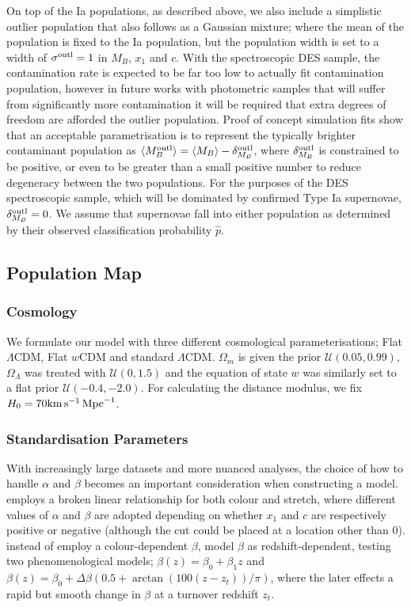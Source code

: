 \documentclass[a4paper,fleqn,usenatbib]{mnras}
\newcommand{\kmsmpc}{{\rm km}\,{\rm s}^{-1}\,{\rm Mpc}^{-1}}
\newcommand{\rubin}{\citetalias{Rubin2015}}
\begin{document}
On top of the Ia populations, as described above, we also include a simplistic outlier population that also follows {\rubin} \citep[and therefore ][]{Kunz2007} as a Gaussian mixture; where the mean of the population is fixed to the Ia population, but the population width is set to a width of $\sigma^{\rm outl} = 1$ in $M_B$, $x_1$ and $c$. With the spectroscopic DES sample, the contamination rate is expected to be far too low to actually fit contamination population, however in future works with photometric samples that will suffer from significantly more contamination it will be required that extra degrees of freedom are afforded the outlier population. Proof of concept simulation fits show that an acceptable parametrisation is to represent the typically brighter contaminant population as $\langle M_B^{\rm outl} \rangle = \langle M_B \rangle - \delta_{M_B}^{\rm outl}$, where $\delta_{M_B}^{\rm outl}$ is constrained to be positive, or even to be greater than a small positive number to reduce degeneracy between the two populations. For the purposes of the DES spectroscopic sample, which will be dominated by confirmed Type Ia supernovae, $\delta_{M_B}^{\rm outl} =0$. We assume that supernovae fall into either population as determined by their observed classification probability $\hat{p}$.


\subsection{Population Map}

\subsubsection{Cosmology}

We formulate our model with three different cosmological parameterisations; Flat $\Lambda$CDM, Flat $w$CDM and standard $\Lambda$CDM. $\Omega_m$ is given the prior $\mathcal{U}(0.05, 0.99)$, $\Omega_\Lambda$ was treated with $\mathcal{U}(0, 1.5)$ and the equation of state $w$ was similarly set to a flat prior $\mathcal{U}(-0.4, -2.0)$. For calculating the distance modulus, we fix $H_0 = 70 \kmsmpc $. 

\subsubsection{Standardisation Parameters}

With increasingly large datasets and more nuanced analyses, the choice of how to handle $\alpha$ and $\beta$ becomes an important consideration when constructing a model. {\rubin} employs a broken linear relationship for both colour and stretch, where different values of $\alpha$ and $\beta$ are adopted depending on whether $x_1$ and $c$ are respectively positive or negative (although the cut could be placed at a location other than 0). \citet{Shariff2016} instead of employ a colour-dependent $\beta$, model $\beta$ as redshift-dependent, testing two phenomenological models; $\beta(z) = \beta_0 + \beta_1 z$ and $\beta(z) = \beta_0 + \Delta \beta\left(0.5 + \arctan(100(z - z_t)) / \pi\right)$, where the later effects a rapid but smooth change in $\beta$ at a turnover redshift $z_t$.
\end{document}
